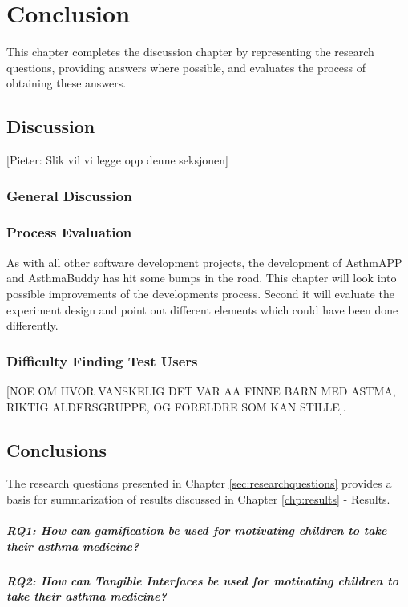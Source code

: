 \chapter{Conclusion}
\label{chp:masterconclusion}

This chapter completes the discussion chapter by representing the research questions, providing answers where possible, and evaluates the process of obtaining these answers. 

\section{Discussion}
\label{sec:discussion}
[Pieter: Slik vil vi legge opp denne seksjonen]

\subsection{General Discussion}
\label{sec:generaldiscussion}


\subsection{Process Evaluation}
\label{sec:processevaluation}
As with all other software development projects, the development of AsthmAPP and AsthmaBuddy has hit some bumps in the road. This chapter will look into possible improvements of the developments process. Second it will evaluate the experiment design and point out different elements which could have been done differently.

\subsection{Difficulty Finding Test Users}
\label{sec:difficultyfindingtestusers}
[NOE OM HVOR VANSKELIG DET VAR AA FINNE BARN MED ASTMA, RIKTIG ALDERSGRUPPE, OG FORELDRE SOM KAN STILLE].

  
\section{Conclusions}
\label{conlusions}

The research questions presented in Chapter \ref{sec:researchquestions} provides a basis for summarization of results discussed in Chapter \ref{chp:results} - Results. 

\paragraph{RQ1: How can gamification be used for motivating children to take their asthma medicine?}



\paragraph{RQ2: How can Tangible Interfaces be used for motivating children to take their asthma medicine?}





